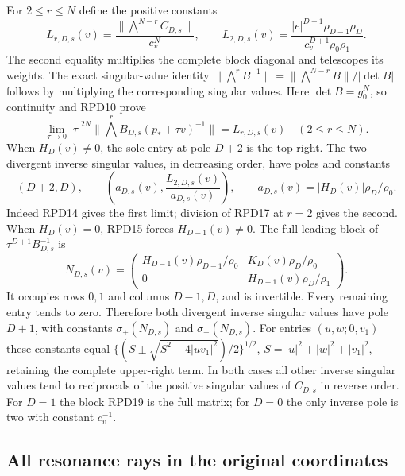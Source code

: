 \documentclass[11pt]{article}
\begin{document}
For $2\le r\le N$ define the positive constants
\[
 L_{r,D,s}(v)=\frac{\|\bigwedge^{N-r}C_{D,s}\|}{c_v^N},\qquad
 L_{2,D,s}(v)=\frac{|e|^{D-1}\rho_{D-1}\rho_D}
                       {c_v^{D+1}\rho_0\rho_1}.\tag{RPD16}
\]
The second equality multiplies the complete block diagonal and
telescopes its weights.  The exact singular-value identity
$\|\bigwedge^rB^{-1}\|=\|\bigwedge^{N-r}B\|/|\det B|$ follows
by multiplying the corresponding singular values.  Here
$\det B=g_0^N$, so continuity and RPD10 prove
\[
 \lim_{\tau\to0}|\tau|^{2N}
  \|\bigwedge^rB_{D,s}(p_*+\tau v)^{-1}\|=L_{r,D,s}(v)
  \quad(2\le r\le N).\tag{RPD17}
\]
When $H_D(v)\ne0$, the sole entry at pole $D+2$ is the top right.
The two divergent inverse singular values, in decreasing order,
have poles and constants
\[
 (D+2,D),\qquad
 \left(a_{D,s}(v),\frac{L_{2,D,s}(v)}{a_{D,s}(v)}\right),\qquad
 a_{D,s}(v)=|H_D(v)|\rho_D/\rho_0.\tag{RPD18}
\]
Indeed RPD14 gives the first limit; division of RPD17 at $r=2$
gives the second.  When $H_D(v)=0$, RPD15 forces $H_{D-1}(v)\ne0$.
The full leading block of $\tau^{D+1}B_{D,s}^{-1}$ is
\[
 N_{D,s}(v)=\begin{pmatrix}
 H_{D-1}(v)\rho_{D-1}/\rho_0&K_D(v)\rho_D/\rho_0\\
 0&H_{D-1}(v)\rho_D/\rho_1
 \end{pmatrix}.\tag{RPD19}
\]
It occupies rows $0,1$ and columns $D-1,D$, and is invertible.
Every remaining entry tends to zero.  Therefore both divergent
inverse singular values have pole $D+1$, with constants
$\sigma_+(N_{D,s})$ and $\sigma_-(N_{D,s})$.
For entries $(u,w;0,v_1)$ these constants equal
$\{(S\pm\sqrt{S^2-4|uv_1|^2})/2\}^{1/2}$,
$S=|u|^2+|w|^2+|v_1|^2$, retaining the complete upper-right term.
In both cases all other inverse singular values tend to reciprocals
of the positive singular values of $C_{D,s}$ in reverse order.
For $D=1$ the block RPD19 is the full matrix; for $D=0$ the only
inverse pole is two with constant $c_v^{-1}$.

\subsection{All resonance rays in the original coordinates}
\end{document}
